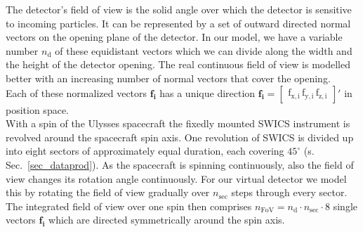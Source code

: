 The detector's field of view is the solid angle over which the detector is sensitive to incoming particles.
It can be represented by a set of outward directed normal vectors on the opening plane of the detector. In our model, we have a variable number $n_\mathrm{d}$ of these equidistant vectors which we can divide along the width and the height of the detector opening. The real continuous field of view is modelled better with an increasing number of normal vectors that cover the opening. \\
Each of these normalized vectors $\mathrm{\mathbf{f_i}}$ has a unique direction $\mathrm{\mathbf{f_i} = \begin{bmatrix}f_{x,i}\,f_{y,i}\,f_{z,i}\end{bmatrix}}'$ in position space.
\\
With a spin of the Ulysses spacecraft the fixedly mounted SWICS instrument is revolved around the spacecraft spin axis. One revolution of SWICS is divided up into eight sectors of approximately equal duration, each covering $45^\circ$ (s. Sec.~\ref{sec_dataprod}). As the spacecraft is spinning continuously, also the field of view changes its rotation angle continuously. For our virtual detector we model this by rotating the field of view gradually over $n_\mathrm{sec}$ steps through every sector.\\
The integrated field of view over one spin then comprises $n_\mathrm{FoV} = n_\mathrm{d} \cdot n_\mathrm{sec} \cdot 8$ single vectors $\mathrm{\mathbf{f_i}}$ which are directed symmetrically around the spin axis.
%
%
%
